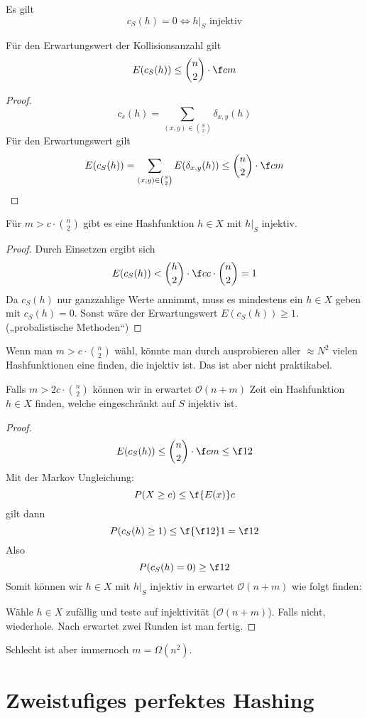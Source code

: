 \documentclass[11pt]{scrbook}
\renewcommand{\O}{\mathcal{O}}
\begin{document}
Es gilt
\[
	c_S(h) = 0 \iff h\Big|_S \text{ injektiv}
\]

\begin{st}
	Für den Erwartungswert der Kollisionsanzahl gilt
	\[
		E(c_S(h)) \le \binom{n}2 \cdot \f cm
	\]
	\begin{proof}
		\[
			c_s(h) = \sum_{(x,y)\in \binom{S}{2}}\delta_{x,y}(h)
		\]
		Für den Erwartungswert gilt
		\[
			E(c_S(h)) = \sum_{(x,y)\in \binom S2}E(\delta_{x,y}(h)) \le \binom n2 \cdot \f cm
		\]		
	\end{proof}
\end{st}

\begin{kor}
	Für $m>c\cdot \binom n2$ gibt es eine Hashfunktion $h\in X$ mit $h\big|_S$ injektiv.
	\begin{proof}
		Durch Einsetzen ergibt sich
		\[
			E(c_S(h)) < \binom h2 \cdot \f c {c\cdot \binom n2} = 1
		\]
		Da $c_S(h)$ nur ganzzahlige Werte annimmt, muss es mindestens ein $h\in X$ geben mit $c_S(h) = 0$.
		Sonst wäre der Erwartungswert $E(c_S(h)) \ge 1$.
		(„probalistische Methoden“)
	\end{proof}
\end{kor}

Wenn man $m>c\cdot \binom n2$ wähl, könnte man durch ausprobieren aller $\approx N^2$ vielen Hashfunktionen eine finden, die injektiv ist.
Das ist aber nicht praktikabel.

\begin{kor}
	Falls $m > 2c\cdot \binom n2$ können wir in erwartet $\O(n+m)$ Zeit ein Hashfunktion $h\in X$ finden, welche eingeschränkt auf $S$ injektiv ist.
	\begin{proof}
		\[
			E(c_S(h)) \le \binom n2 \cdot \f cm \le \f 12
		\]
		Mit der Markov Ungleichung:
		\[
			P(X\ge c) \le \f{E(x)}c
		\]
		gilt dann
		\[
			P(c_S(h) \ge 1) \le \f{\f 12}1 = \f 12
		\]
		Also
		\[
			P(c_S(h)=0) \ge \f 12
		\]
		Somit können wir $h\in X$ mit $h\big|_S$ injektiv in erwartet $\O(n+m)$ wie folgt finden:

		Wähle $h\in X$ zufällig und teste auf injektivität ($\O(n+m)$).
		Falls nicht, wiederhole.
		Nach erwartet zwei Runden ist man fertig.
	\end{proof}
\end{kor}

Schlecht ist aber immernoch $m=\Omega(n^2)$.


\section{Zweistufiges perfektes Hashing}
\end{document}
